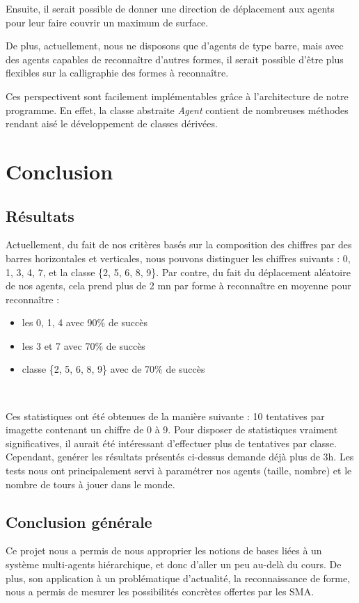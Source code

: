\documentclass[a4paper,12pt]{report}
\begin{document}
Ensuite, il serait possible de donner une direction de déplacement aux agents pour leur faire couvrir un maximum de surface.

De plus, actuellement, nous ne disposons que d'agents de type \og{}barre\fg{}, mais avec des agents capables de reconnaître d'autres formes, il serait possible d'être plus flexibles sur la calligraphie des formes à reconnaître.

Ces perspectivent sont facilement implémentables grâce à l'architecture de notre programme. En effet, la classe abstraite \emph{Agent} contient de nombreuses méthodes rendant aisé le développement de classes dérivées.





\chapter{Conclusion}
\section{Résultats}
Actuellement, du fait de nos critères basés sur la composition des chiffres par des barres horizontales et verticales, nous pouvons distinguer les chiffres suivants : 0, 1, 3, 4, 7, et la classe \{2, 5, 6, 8, 9\}. Par contre, du fait du déplacement aléatoire de nos agents, cela prend plus de 2 mn par forme à reconnaître en moyenne pour reconnaître :
\begin{itemize}
 \item les 0, 1, 4 avec 90\% de succès
 \item les 3 et 7 avec 70\% de succès
 \item classe \{2, 5, 6, 8, 9\} avec de 70\% de succès
\end{itemize}

~

Ces statistiques ont été obtenues de la manière suivante : 10 tentatives par imagette contenant un chiffre de 0 à 9. Pour disposer de statistiques vraiment significatives, il aurait été intéressant d'effectuer plus de tentatives par classe. Cependant, genérer les résultats présentés ci-dessus demande déjà plus de 3h. Les tests nous ont principalement servi à paramétrer nos agents (taille, nombre) et le nombre de tours à jouer dans le monde.


\section{Conclusion générale}
Ce projet nous a permis de nous approprier les notions de bases liées à un système multi-agents hiérarchique, et donc d'aller un peu au-delà du cours. De plus, son application à un problématique d'actualité, la reconnaissance de forme, nous  a permis de mesurer les possibilités concrètes offertes par les SMA.
\end{document}
